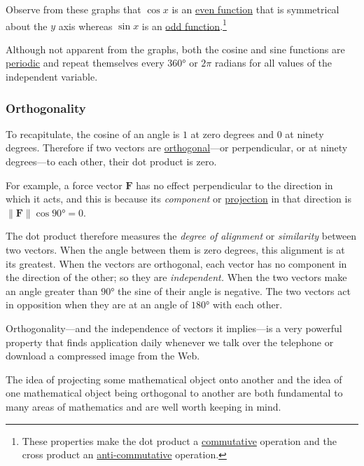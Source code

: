 \documentclass[
  a4paper,
]{article}
\begin{document}
Observe from these graphs that \(\cos x\) is an
\href{https://mathworld.wolfram.com/EvenFunction.html}{even function}
that is symmetrical about the \(y\) axis whereas \(\sin x\) is an
\href{https://mathworld.wolfram.com/OddFunction.html}{odd
function}.\footnote{These properties make the dot product a
  \href{https://mathworld.wolfram.com/Commutative.html}{commutative}
  operation and the cross product an
  \href{https://mathworld.wolfram.com/Anticommutative.html}{anti-commutative}
  operation.}

Although not apparent from the graphs, both the cosine and sine
functions are
\href{https://mathworld.wolfram.com/PeriodicFunction.html}{periodic} and
repeat themselves every \(360°\) or \(2\pi\) radians for all values of
the independent variable.

\hypertarget{orthogonality}{%
\subsubsection{Orthogonality}\label{orthogonality}}

To recapitulate, the cosine of an angle is \(1\) at zero degrees and
\(0\) at ninety degrees. Therefore if two vectors are
\href{https://mathworld.wolfram.com/Orthogonal.html}{orthogonal}---or
perpendicular, or at ninety degrees---to each other, their dot product
is zero.

For example, a force vector \(\symbf{F}\) has no effect perpendicular to
the direction in which it acts, and this is because its \emph{component}
or \href{https://en.wikipedia.org/wiki/Vector_projection}{projection} in
that direction is \(\lVert\symbf{F}\rVert\cos 90° = 0\).

The dot product therefore measures the \emph{degree of alignment} or
\emph{similarity} between two vectors. When the angle between them is
zero degrees, this alignment is at its greatest. When the vectors are
orthogonal, each vector has no component in the direction of the other;
so they are \emph{independent.} When the two vectors make an angle
greater than \(90°\) the sine of their angle is negative. The two
vectors act in opposition when they are at an angle of \(180°\) with
each other.

Orthogonality---and the independence of vectors it implies---is a very
powerful property that finds application daily whenever we talk over the
telephone or download a compressed image from the Web.

The idea of projecting some mathematical object onto another and the
idea of one mathematical object being orthogonal to another are both
fundamental to many areas of mathematics and are well worth keeping in
mind.
\end{document}

